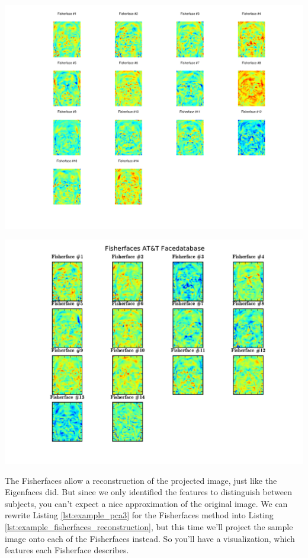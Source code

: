 \ifx\python\undefined
	\begin{center}
		\includegraphics[scale=0.6]{img/fisherfaces/octave_fisherfaces_fisherfaces}
	\end{center}
\else
	\begin{center}
		\includegraphics[scale=0.6]{img/fisherfaces/python_fisherfaces_fisherfaces}
	\end{center}
\fi

The Fisherfaces allow a reconstruction of the projected image, just like the Eigenfaces did. But since we only identified the features to distinguish between subjects, you can't expect a nice approximation of the original image. We can rewrite Listing \ref{lst:example_pca3} for the Fisherfaces method into Listing \ref{lst:example_fisherfaces_reconstruction}, but this time we'll project the sample image onto each of the Fisherfaces instead. So you'll have a visualization, which features each Fisherface describes.

